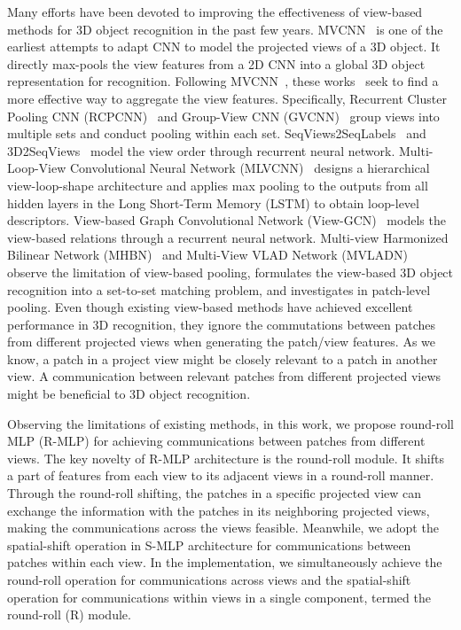 \documentclass[11pt]{article}
\begin{document}
Many efforts have been devoted to improving the effectiveness of view-based methods for 3D object recognition in the past few years. MVCNN~\citep{su2015multi} is one of the earliest attempts to adapt CNN to model the projected views of a 3D object. It directly max-pools the view features from a 2D CNN into a global 3D object representation for recognition. Following MVCNN~\citep{su2015multi}, these works~\citep{feng2018gvcnn,han20193d2seqvies,han2019seqview2seqlabels,wang2017dominant,kanezaki2018rotationnet,wei2020view} seek to find a more effective way to aggregate the view features. Specifically, Recurrent Cluster Pooling CNN (RCPCNN)~\citep{wang2017dominant} and Group-View CNN (GVCNN)~\citep{feng2018gvcnn} group views into multiple sets and conduct pooling within each set. SeqViews2SeqLabels~\citep{han2019seqview2seqlabels} and 3D2SeqViews~\citep{han20193d2seqvies} model the view order through recurrent neural network. Multi-Loop-View Convolutional Neural Network (MLVCNN)~\citep{jiang2019mlvcnn} designs a hierarchical view-loop-shape architecture and applies max pooling to the outputs from all hidden layers in the Long Short-Term Memory (LSTM) to obtain loop-level descriptors. View-based Graph Convolutional Network (View-GCN)~\citep{wei2020view} models the view-based relations through a recurrent neural network. Multi-view Harmonized Bilinear Network (MHBN)~\citep{yu2018multi} and Multi-View VLAD Network (MVLADN)~\citep{yu20213d} observe the limitation of view-based pooling, formulates the view-based 3D object recognition into a set-to-set matching problem, and investigates in patch-level pooling. Even though existing view-based methods have achieved excellent performance in 3D recognition,  they ignore the commutations between patches from different projected views when generating the patch/view features. As we know, a patch in a project view might be closely relevant to a patch in another view. A communication between relevant patches from different projected views might be beneficial to 3D object recognition.

Observing the limitations of existing methods, in this work, we propose round-roll MLP (R-MLP) for achieving communications between patches from different views. The key novelty of R-MLP architecture is the round-roll module. It shifts a part of features from each view to its adjacent views in a round-roll manner. Through the round-roll shifting, the patches in a specific projected view can exchange the information with the patches in its neighboring projected views, making the communications across the views feasible. Meanwhile, we adopt the spatial-shift operation in S-MLP architecture for communications between patches within each view.  In the implementation, we simultaneously achieve the round-roll operation for communications across views and the spatial-shift operation for communications within views in a single component, termed the round-roll (R) module.
\end{document}
